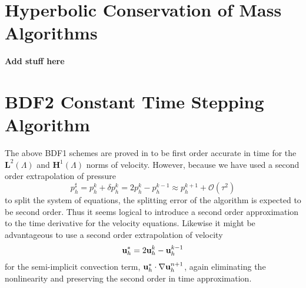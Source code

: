 \documentclass[letterpaper]{erdc}
\begin{document}
%



%
%
%
\section{Hyperbolic Conservation of Mass Algorithms}\label{sec:ConservationOfMassNumericalApproach}

\textbf{ Add stuff here}



%
%
%
\section{BDF2 Constant Time Stepping Algorithm}\label{sec:BDF2ConstantTimeSteppingAlgorithm}

The above BDF1 schemes are proved in \cite{guermond2011error} to be first order accurate in time for the $\mathbf{L}^2(\Lambda)$ and $\mathbf{H}^1(\Lambda)$ norms of velocity.  However, because we have used a second order extrapolation of pressure
\begin{equation}
  p^{\sharp}_h = p_h^{k} + \delta p_h^{k} = 2p^{k}_h-p^{k-1}_h \approx p_h^{k+1} + \mathcal{O}\left(\tau^2 \right)
\end{equation}
to split the system of equations, the splitting error of the algorithm is expected to be second order.  Thus it seems logical to introduce a second order approximation to the time derivative for the velocity equations.  Likewise it might be advantageous to use a second order extrapolation of velocity 
\begin{equation}
  \textbf{u}^{*}_h = 2\textbf{u}_h^{k}  - \textbf{u}_h^{k-1}
\end{equation}
for the semi-implicit convection term, $\textbf{u}_h^{*}\cdot\nabla\textbf{u}_h^{n+1}$, again eliminating the nonlinearity and preserving the second order in time approximation.
\end{document}

